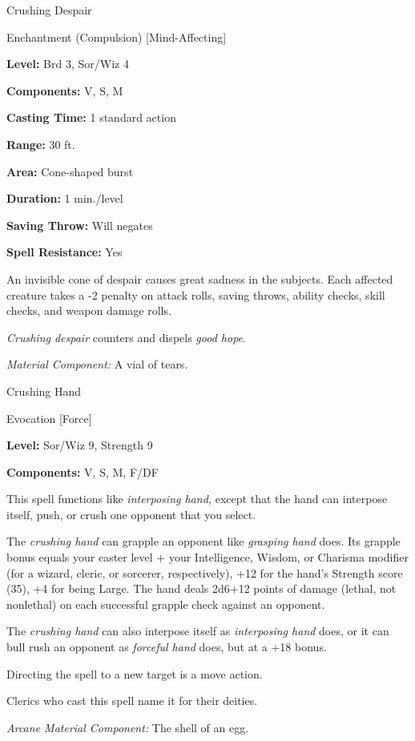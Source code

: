 \documentclass{article}
\begin{document}
\vspace{12pt}
Crushing Despair

Enchantment (Compulsion) [Mind-Affecting]

\textbf{Level:} Brd 3, Sor/Wiz 4

\textbf{Components:} V, S, M

\textbf{Casting Time:} 1 standard action

\textbf{Range:} 30 ft.

\textbf{Area:} Cone-shaped burst

\textbf{Duration:} 1 min./level

\textbf{Saving Throw: }Will negates

\textbf{Spell Resistance:} Yes

An invisible cone of despair causes great sadness in the subjects. Each affected 
creature takes a -2 penalty on attack rolls, saving throws, ability checks, skill 
checks, and weapon damage rolls.

\textit{Crushing despair }counters and dispels \textit{good hope}.

\textit{Material Component: }A vial of tears.

\vspace{12pt}
Crushing Hand

Evocation [Force]

\textbf{Level:} Sor/Wiz 9, Strength 9

\textbf{Components:} V, S, M, F/DF

This spell functions like \textit{interposing hand, }except that the hand can interpose 
itself, push, or crush one opponent that you select.

The \textit{crushing hand }can grapple an opponent like \textit{grasping hand }does. 
Its grapple bonus equals your caster level + your Intelligence, Wisdom, or Charisma 
modifier (for a wizard, cleric, or sorcerer, respectively), +12 for the hand's 
Strength score (35), +4 for being Large. The hand deals 2d6+12 points of damage 
(lethal, not nonlethal) on each successful grapple check against an opponent.

The \textit{crushing hand }can also interpose itself as \textit{interposing hand 
}does, or it can bull rush an opponent as \textit{forceful hand }does, but at a 
+18 bonus.

Directing the spell to a new target is a move action.

Clerics who cast this spell name it for their deities.

\textit{Arcane Material Component: }The shell of an egg.
\end{document}
